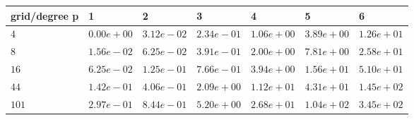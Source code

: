 \begin{tabular}{lllllll}
\hline
 grid/degree p   & 1          & 2          & 3          & 4          & 5          & 6          \\
\hline
 $4$             & $0.00e+00$ & $3.12e-02$ & $2.34e-01$ & $1.06e+00$ & $3.89e+00$ & $1.26e+01$ \\
 $8$             & $1.56e-02$ & $6.25e-02$ & $3.91e-01$ & $2.00e+00$ & $7.81e+00$ & $2.58e+01$ \\
 $16$            & $6.25e-02$ & $1.25e-01$ & $7.66e-01$ & $3.94e+00$ & $1.56e+01$ & $5.10e+01$ \\
 $44$            & $1.42e-01$ & $4.06e-01$ & $2.09e+00$ & $1.12e+01$ & $4.31e+01$ & $1.45e+02$ \\
 $101$           & $2.97e-01$ & $8.44e-01$ & $5.20e+00$ & $2.68e+01$ & $1.04e+02$ & $3.45e+02$ \\
\hline
\end{tabular}